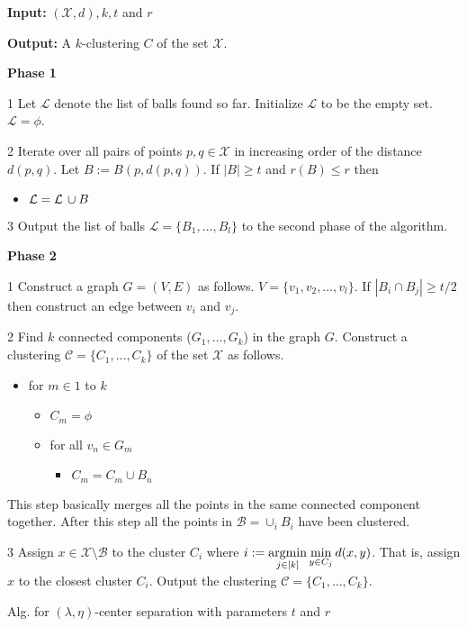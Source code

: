 \documentclass[11pt]{article}
\newcommand{\mc}{\mathcal}
\newenvironment{alg}{
    \begin{list}{}{
        \setlength{\itemsep}{2pt}
        \setlength{\parsep}{0pt}
        \setlength{\parskip}{0pt}
        \setlength{\topsep}{1pt}
    }
}
{
    \end{list}
}
\begin{document}
\begin{algorithm}[!ht]
\begin{alg}
	\item \textbf{Input: } $(\mc X, d), k, t$ and $r$
	\item \textbf{Output: } A $k$-clustering $C$ of the set $\mc X$.\\
	\item \textbf{Phase 1}
	\item[1] Let $\mc L$ denote the list of balls found so far. Initialize $\mc L$ to be the empty set. $\mc L = \phi$.
	\item[2] Iterate over all pairs of points $p, q \in \mc X$ in increasing order of the distance $d(p, q)$. Let $B := B(p, d(p, q))$. If $|B| \ge t$ and $r(B) \le r$ then
	\begin{itemize}
	\renewcommand\labelitemi{}
		\item $\mc L = \mc L \thinspace\cup B$
	\end{itemize}
	\item[3] Output the list of balls $\mc L = \{B_1, \ldots, B_l\}$ to the second phase of the algorithm.\\
	\item \textbf{Phase 2}
	\item[1] Construct a graph $G = (V, E)$ as follows. $V = \{v_1, v_2, \ldots, v_l\}$. If $|B_i \cap B_j| \ge t/2$ then construct an edge between $v_i$ and $v_j$.
	\item[2] Find $k$ connected components ($G_1, \ldots, G_{k}$) in the graph $G$. Construct a clustering $\mc C = \{C_1, \ldots, C_k\}$ of the set $\mc X$ as follows.
	\begin{itemize}
	\renewcommand\labelitemi{}
		\item for $m \in 1$ to $k$
		\begin{itemize}
			\renewcommand\labelitemii{}
			\item $C_m = \phi$
			\item for all $v_n \in G_m$
			\begin{itemize}
				\renewcommand\labelitemiii{}
				\item $C_m = C_m \cup B_n$
			\end{itemize}
		\end{itemize}
	\end{itemize}
	This step basically merges all the points in the same connected component together. After this step all the points in $\mc B = \cup_i B_i$ have been clustered.
	\item[3] Assign $x \in \mc X \setminus \mc B$ to the cluster $C_i$ where $i := \argmin\limits_{j\in [k]} \min\limits_{y \in C_j}d(x, y)$. That is, assign $x$ to the closest cluster $C_i$. Output the clustering $\mc C = \{C_1, \ldots, C_k\}$. 
\end{alg}
\caption{Alg. for $(\lambda, \eta)$-center separation with parameters $t$ and $r$}
\label{alg:lambdacs}
\end{algorithm}
\end{document}
